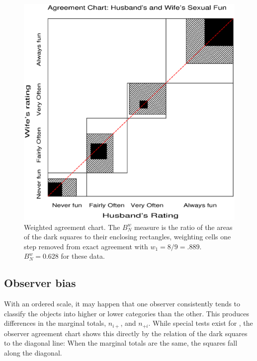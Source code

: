\begin{figure}[htb]
  \centering
  \includegraphics[scale=.5]{ch3/fig/agree12}
  \caption[Weighted agreement chart]{Weighted agreement chart.  The
\(B_N^w\) measure is the ratio of the areas of the dark squares to
their enclosing rectangles, weighting cells one step removed from
exact agreement with \(w_1 = 8 / 9 = .889\).  \(B_N^w  =
0.628\) for these data.}\label{fig:agree12}
\end{figure}

\subsection{Observer bias}\label{sec:Observer}

With an ordered scale, it may happen that one observer consistently
tends to classify the objects into higher or lower categories than
the other.  This produces differences in the marginal totals,
\(n_{i+}\), and \(n_{+i}\).  While special tests exist for
, the observer agreement chart shows this
directly by the relation of the dark squares to the diagonal line:
When the marginal totals are the same, the squares fall along the
diagonal.

